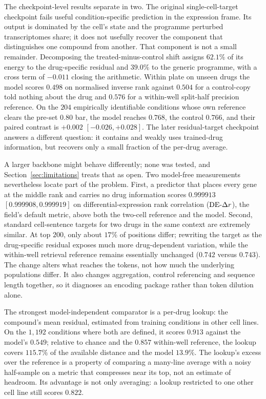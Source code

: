 The checkpoint-level results separate in two. The original single-cell-target checkpoint fails
useful condition-specific prediction in the expression frame. Its output is dominated by the cell's
state and the programme perturbed transcriptomes share; it does not usefully recover the component
that distinguishes one compound from another. That component is not a small remainder. Decomposing
the treated-minus-control shift assigns $62.1\%$ of its energy to the drug-specific residual and
$39.0\%$ to the generic programme, with a cross term of $-0.011$ closing the arithmetic. Within
plate on unseen drugs the model scores $0.498$ on normalised inverse rank against $0.504$ for a
control-copy told nothing about the drug and $0.576$ for a within-well split-half precision
reference. On the $204$ empirically identifiable conditions whose own reference clears the
pre-set $0.80$ bar, the model reaches $0.768$, the control $0.766$, and their paired contrast is
$+0.002$ \nolinebreak[3]$[-0.026,+0.028]$. The later residual-target checkpoint answers a different
question: it contains and weakly uses trained-drug information, but recovers only a small fraction
of the per-drug average.

A larger backbone might behave differently; none was tested, and Section~\ref{sec:limitations}
treats that as open. Two model-free measurements nevertheless locate part of the problem. First, a
predictor that places every gene at the middle rank and carries no drug information scores
$0.999913$ \nolinebreak[3]$[0.999908,0.999919]$ on differential-expression rank correlation
($\textrm{DE-}\Delta r$), the field's default metric, above both the
two-cell reference and the model. Second, standard cell-sentence targets for two drugs in the same
context are extremely similar. At top $200$, only about $17\%$ of positions differ; rewriting the
target as the drug-specific residual exposes much more drug-dependent variation, while the
within-well retrieval reference remains essentially unchanged ($0.742$ versus $0.743$). The change
alters what reaches the tokens, not how much the underlying populations differ. It also changes
aggregation, control referencing and sequence length together, so it diagnoses an encoding package
rather than token dilution alone.

The strongest model-independent comparator is a per-drug lookup: the compound's mean residual,
estimated from training conditions in other cell lines. On the $1{,}192$ conditions where both are
defined, it scores $0.913$ against the model's $0.549$; relative to chance and the $0.857$
within-well reference, the lookup covers $115.7\%$ of the available distance and the model $13.9\%$.
The lookup's excess over the reference is a property of comparing a many-line average with a noisy
half-sample on a metric that compresses near its top, not an estimate of headroom. Its advantage is
not only averaging: a lookup restricted to one other cell line still scores $0.822$.

